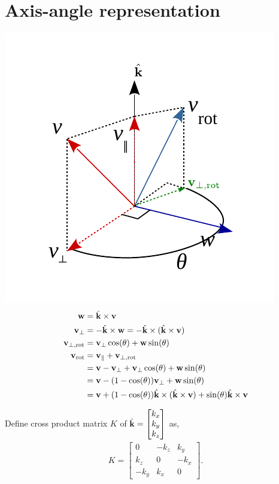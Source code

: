 \documentclass[twocolumn]{article}
\begin{document}
\section{Axis-angle representation}
\includegraphics[width=\linewidth]{media/Rodrigues-formula.pdf}
%
\begin{align}
  \mathbf{w} &= \hat{\mathbf{k}} \times \mathbf{v}
  \\
  \mathbf{v}_\perp &= - \hat{\mathbf{k}} \times \mathbf{w} = -  \hat{\mathbf{k}} \times (\hat{\mathbf{k}} \times \mathbf{v})
  \\
  \mathbf{v}_{\perp,\text{rot}}  &= \mathbf{v}_\perp\cos(\theta) + \mathbf{w}\sin(\theta)
  \\
  \mathbf{v}_{\text{rot}} &=  \mathbf{v}_\parallel +   \mathbf{v}_{\perp,\text{rot}}
  \notag\\
       &=  \mathbf{v} - \mathbf{v}_\perp +   \mathbf{v}_\perp\cos(\theta) + \mathbf{w}\sin(\theta)
  \notag\\
       &=  \mathbf{v} - (1-\cos(\theta)) \mathbf{v}_\perp + \mathbf{w} \sin(\theta)
  \notag\\
       &=  \mathbf{v} + (1-\cos(\theta)) \hat{\mathbf{k}} \times (\hat{\mathbf{k}} \times \mathbf{v}) +  \sin(\theta) \hat{\mathbf{k}} \times \mathbf{v}
\end{align}

Define  cross  product matrix $K$  of $\hat{\mathbf{k}} = \begin{bmatrix}  k_x \\ k_y
  \\ k_z \end{bmatrix}$  as,
\begin{align}
  K  = \begin{bmatrix}
    0   & - k_z & k_y   \\
    k_z   & 0 & -k_x   \\
    -k_y   & k_x & 0
  \end{bmatrix}.
\end{align}
\end{document}
